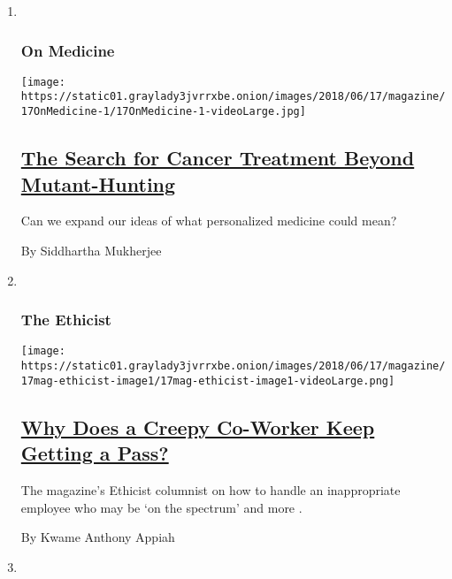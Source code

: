\begin{enumerate}
\def\labelenumi{\arabic{enumi}.}
\item ~
  \hypertarget{on-medicine}{%
  \subsubsection{On Medicine}\label{on-medicine}}

  \texttt{[image: https://static01.graylady3jvrrxbe.onion/images/2018/06/17/magazine/17OnMedicine-1/17OnMedicine-1-videoLarge.jpg]}

  \hypertarget{the-search-for-cancer-treatment-beyond-mutant-hunting}{%
  \subsection{\texorpdfstring{\href{/2018/06/13/magazine/the-search-for-cancer-treatment-that-is-personal-and-useful.html}{The
  Search for Cancer Treatment Beyond
  Mutant-Hunting}}{The Search for Cancer Treatment Beyond Mutant-Hunting}}\label{the-search-for-cancer-treatment-beyond-mutant-hunting}}

  Can we expand our ideas of what personalized medicine could mean?

  By Siddhartha Mukherjee
\item ~
  \hypertarget{the-ethicist}{%
  \subsubsection{The Ethicist}\label{the-ethicist}}

  \texttt{[image: https://static01.graylady3jvrrxbe.onion/images/2018/06/17/magazine/17mag-ethicist-image1/17mag-ethicist-image1-videoLarge.png]}

  \hypertarget{why-does-a-creepy-co-worker-keep-getting-a-pass}{%
  \subsection{\texorpdfstring{\href{/2018/06/12/magazine/why-does-a-creepy-co-worker-keep-getting-a-pass.html}{Why
  Does a Creepy Co-Worker Keep Getting a
  Pass?}}{Why Does a Creepy Co-Worker Keep Getting a Pass?}}\label{why-does-a-creepy-co-worker-keep-getting-a-pass}}

  The magazine's Ethicist columnist on how to handle an inappropriate
  employee who may be `on the spectrum' and more .

  By Kwame Anthony Appiah
\item ~
  \hypertarget{diagnosis}{%
}
\end{enumerate}
